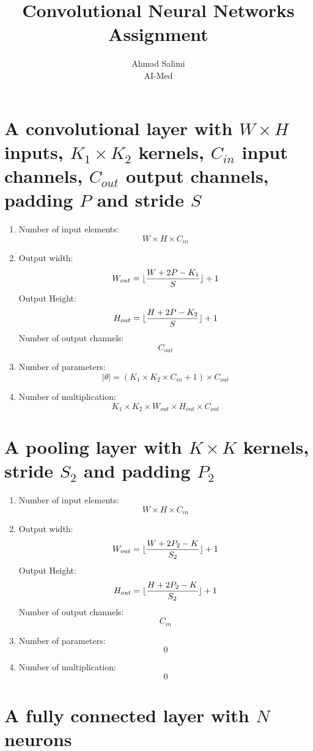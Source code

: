 \documentclass[a4paper]{article}
\title{Convolutional Neural Networks Assignment}
\author{Ahmad Salimi \\ AI-Med}
\DeclarePairedDelimiter\floor{\lfloor}{\rfloor}
\begin{document}
\maketitle


\section{A convolutional layer with $W \times H$ inputs, $K_1 \times K_2$ kernels, $C_{in}$ input channels, $C_{out}$ output channels, padding $P$ and stride $S$}

\begin{enumerate}
    \item Number of input elements: 
        $$W \times H \times C_{in}$$
    \item Output width:
        $$W_{out} = \floor{\frac{W + 2P - K_1}{S}} + 1$$
        Output Height:
        $$H_{out} = \floor{\frac{H + 2P - K_2}{S}} + 1$$
        Number of output channels:
        $$C_{out}$$
    \item Number of parameters:
        $$|\theta| = (K_1 \times K_2 \times C_{in} + 1) \times C_{out}$$
    \item Number of multiplication:
        $$K_1 \times K_2 \times W_{out} \times H_{out} \times C_{out}$$
\end{enumerate}


\section{A pooling layer with $K \times K$ kernels, stride $S_2$ and padding $P_2$}

\begin{enumerate}
    \item Number of input elements: 
        $$W \times H \times C_{in}$$
    \item Output width:
        $$W_{out} = \floor{\frac{W + 2P_2 - K}{S_2}} + 1$$
        Output Height:
        $$H_{out} = \floor{\frac{H + 2P_2 - K}{S_2}} + 1$$
        Number of output channels:
        $$C_{in}$$
    \item Number of parameters:
        $$0$$
    \item Number of multiplication:
        $$0$$
\end{enumerate}


\section{A fully connected layer with $N$ neurons}
\end{document}
